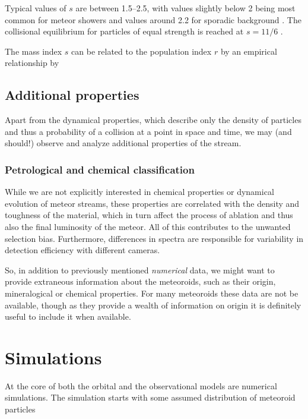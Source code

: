             Typical values of $s$ are between \numrange{1.5}{2.5}, with values slightly below 2 being most common
            for meteor showers and values around \num{2.2} for sporadic background \citep{blaauw+2011}.
            The collisional equilibrium for particles of equal strength is reached at $s = 11/6$ \citep{dohnanyi1969}.

            The mass index $s$ can be related to the population index $r$ by an empirical relationship by \citet{koschack+1990}


    \subsection{Additional properties} \label{moa}
        Apart from the dynamical properties, which describe only the density of particles
        and thus a probability of a collision at a point in space and time,
        we may (and should!) observe and analyze additional properties of the stream.

        \subsubsection{Petrological and chemical classification} \label{moac}
            While we are not explicitly interested in chemical properties
            or dynamical evolution of meteor streams, these properties
            are correlated with the density and toughness of the material,
            which in turn affect the process of ablation
            and thus also the final luminosity of the meteor.
            All of this contributes to the unwanted selection bias.
            Furthermore, differences in spectra are responsible for
            variability in detection efficiency with different cameras.

            So, in addition to previously mentioned \textit{numerical} data, we might want to
            provide extraneous information about the meteoroids, such as their origin,
            mineralogical or chemical properties.
            For many meteoroids these data are not be available,
            though as they provide a wealth of information on origin
            it is definitely useful to include it when available.


\section{Simulations} \label{mi}
    At the core of both the orbital and the observational models are numerical simulations.
    The simulation starts with some assumed distribution of meteoroid particles

